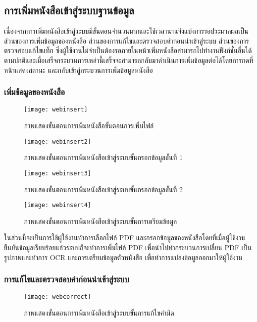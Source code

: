 \subsection{การเพิ่มหนังสือเข้าสู่ระบบฐานข้อมูล}
เนื่องจากการเพิ่มหนังสือเข้าสู่ระบบมีขั้นตอนจำนวนมากและใช้เวลานานจึงแบ่งการรอประมวลผลเป็นส่วนของการเพิ่มข้อมูลของหนังสือ ส่วนของการแก้ไขและตรวจสอบคำก่อนนำเข้าสู่ระบบ ส่วนของการตรวจสอบแก้ไขแท็ก ซึ่งผู้ใช้งานไม่จำเป็นต้องรอภายในหน้าเพิ่มหนังสือสามารถไปทำงานฟังก์ชั่นอื่นได้ตามปกติและเมื่อเสร็จกระบวนการเหล่านี้เสร็จจะสามารถกลับมาดำเนินการเพิ่มข้อมูลต่อได้โดยการกดที่หน้าแสดงสถานะ และกลับเข้าสู่กระบวนการเพิ่มข้อมูลหนังสือ
\subsubsection{เพิ่มข้อมูลของหนังสือ}
\begin{figure}[H]
    \centering
    \texttt{[image: webinsert]}
    \caption{ภาพแสดงขั้นตอนการเพิ่มหนังสือขั้นตอนการเพิ่มไฟล์}\label{fig:webinsert}
\end{figure}
\begin{figure}[H]
    \centering
    \texttt{[image: webinsert2]}
    \caption{ภาพแสดงขั้นตอนการเพิ่มหนังสือเข้าสู่ระบบขั้นกรอกข้อมูลขั้นที่ 1}\label{fig:webinsert2}
\end{figure}
\begin{figure}[H]
    \centering
    \texttt{[image: webinsert3]}
    \caption{ภาพแสดงขั้นตอนการเพิ่มหนังสือเข้าสู่ระบบขั้นกรอกข้อมูลขั้นที่ 2}\label{fig:webinsert3}
\end{figure}

\begin{figure}[H]
    \centering
    \texttt{[image: webinsert4]}
    \caption{ภาพแสดงขั้นตอนการเพิ่มหนังสือเข้าสู่ระบบขั้นการเตรียมข้อมูล}\label{fig:webdel}
\end{figure}
ในส่วนนี้จะเป็นการใช้ผู้ใช้งานทำการเลือกไฟล์ PDF และกรอกข้อมูลของหนังสือโดยที่เมื่อผู้ใช้งานยืนยันข้อมูลเรียบร้อยแล้วระบบก็จะทำการเพิ่มไฟล์ PDF เพื่อนำไปทำกระบวนการเปลี่ยน PDF เป็นรูปภาพและทำการ OCR และการเตรียมข้อมูลตัวหนังสือ  เพื่อทำการแปลงข้อมูลออกมาให้ผู้ใช้งาน

\subsubsection{การแก้ไขและตรวจสอบคำก่อนนำเข้าสู่ระบบ}
\begin{figure}[H]
    \centering
    \texttt{[image: webcorrect]}
    \caption{ภาพแสดงขั้นตอนการเพิ่มหนังสือเข้าสู่ระบบขั้นการแก้ไขคำผิด}\label{fig:webcorrect}
\end{figure}

